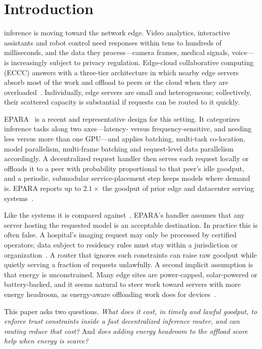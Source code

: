 \documentclass[journal]{IEEEtran}
\begin{document}
\section{Introduction}\label{sec:intro}

 inference is moving toward the network edge. Video analytics, interactive assistants and robot control need responses within tens to hundreds of milliseconds, and the data they process---camera frames, medical signals, voice---is increasingly subject to privacy regulation. Edge-cloud collaborative computing (ECCC) answers with a three-tier architecture in which nearby edge servers absorb most of the work and offload to peers or the cloud when they are overloaded~\cite{liu2025eccc}. Individually, edge servers are small and heterogeneous; collectively, their scattered capacity is substantial if requests can be routed to it quickly.

EPARA~\cite{epara2025} is a recent and representative design for this setting. It categorizes inference tasks along two axes---latency- versus frequency-sensitive, and needing less versus more than one GPU---and applies batching, multi-task co-location, model parallelism, multi-frame batching and request-level data parallelism accordingly. A decentralized request handler then serves each request locally or offloads it to a peer with probability proportional to that peer's idle goodput, and a periodic, submodular service-placement step keeps models where demand is. EPARA reports up to $2.1\times$ the goodput of prior edge and datacenter serving systems~\cite{epara2025}.

Like the systems it is compared against~\cite{interedge,galaxy,servp,alpaserve,usher}, EPARA's handler assumes that any server hosting the requested model is an acceptable destination. In practice this is often false. A hospital's imaging request may only be processed by certified operators; data subject to residency rules must stay within a jurisdiction or organization~\cite{gdpr}. A router that ignores such constraints can raise raw goodput while quietly serving a fraction of requests unlawfully. A second implicit assumption is that energy is unconstrained. Many edge sites are power-capped, solar-powered or battery-backed, and it seems natural to steer work toward servers with more energy headroom, as energy-aware offloading work does for devices~\cite{mao2016harvest,min2019privacy}.

This paper asks two questions. \emph{What does it cost, in timely and lawful goodput, to enforce trust constraints inside a fast decentralized inference router, and can routing reduce that cost?} And \emph{does adding energy headroom to the offload score help when energy is scarce?}
\end{document}
